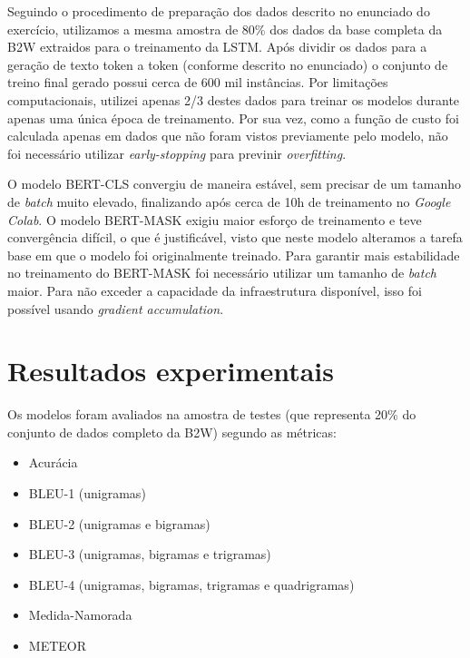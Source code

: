 \documentclass{article}
\begin{document}
Seguindo o procedimento de preparação dos dados descrito no enunciado do exercício, utilizamos a mesma amostra de 80\% dos dados da base completa da B2W extraidos para o treinamento da LSTM. Após dividir os dados para a geração de texto token a token (conforme descrito no enunciado) o conjunto de treino final gerado possui cerca de 600 mil instâncias. Por limitações computacionais, utilizei apenas 2/3 destes dados para treinar os modelos durante apenas uma única época de treinamento. Por sua vez, como a função de custo foi calculada apenas em dados que não foram vistos previamente pelo modelo, não foi necessário utilizar \textit{early-stopping} para previnir \textit{overfitting}.

O modelo BERT-CLS convergiu de maneira estável, sem precisar de um tamanho de \textit{batch} muito elevado, finalizando após cerca de 10h de treinamento no \textit{Google Colab}. O modelo BERT-MASK exigiu maior esforço de treinamento e teve convergência difícil, o que é justificável, visto que neste modelo alteramos a tarefa base em que o modelo foi originalmente treinado. Para garantir mais estabilidade no treinamento do BERT-MASK foi necessário utilizar um tamanho de \textit{batch} maior. Para não exceder a capacidade da infraestrutura disponível, isso foi possível usando \textit{gradient accumulation}. %

\vspace{5em}

\section{Resultados experimentais}

Os modelos foram avaliados na amostra de testes (que representa 20\% do conjunto de dados completo da B2W) segundo as métricas:

\begin{itemize}
	\item Acurácia
	\item BLEU-1 (unigramas)
	\item BLEU-2 (unigramas e bigramas)
	\item BLEU-3 (unigramas, bigramas e trigramas)
	\item BLEU-4 (unigramas, bigramas, trigramas e quadrigramas)
	\item Medida-Namorada
	\item METEOR
\end{itemize}
\end{document}
